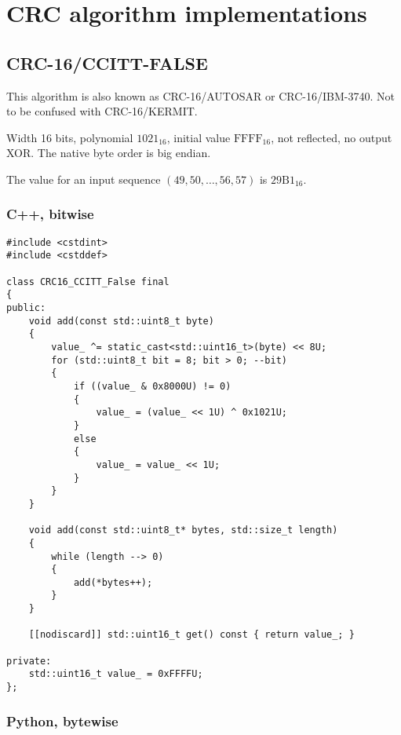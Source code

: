 \chapter{CRC algorithm implementations}

\section{CRC-16/CCITT-FALSE}\label{sec:appendix_crc16ccitt_false}

This algorithm is also known as CRC-16/AUTOSAR or CRC-16/IBM-3740.
Not to be confused with CRC-16/KERMIT.

Width 16 bits,
polynomial $\mathrm{1021}_{16}$,
initial value $\mathrm{FFFF}_{16}$,
not reflected,
no output XOR.
The native byte order is big endian.

The value for an input sequence $\left(49, 50, \ldots, 56, 57\right)$ is $\mathrm{29B1}_{16}$.

\subsection{C++, bitwise}

\begin{samepage}
\begin{verbatim}
#include <cstdint>
#include <cstddef>

class CRC16_CCITT_False final
{
public:
    void add(const std::uint8_t byte)
    {
        value_ ^= static_cast<std::uint16_t>(byte) << 8U;
        for (std::uint8_t bit = 8; bit > 0; --bit)
        {
            if ((value_ & 0x8000U) != 0)
            {
                value_ = (value_ << 1U) ^ 0x1021U;
            }
            else
            {
                value_ = value_ << 1U;
            }
        }
    }

    void add(const std::uint8_t* bytes, std::size_t length)
    {
        while (length --> 0)
        {
            add(*bytes++);
        }
    }

    [[nodiscard]] std::uint16_t get() const { return value_; }

private:
    std::uint16_t value_ = 0xFFFFU;
};
\end{verbatim}
\end{samepage}

\subsection{Python, bytewise}

